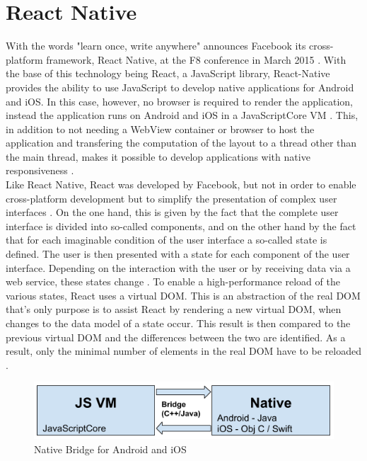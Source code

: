 \documentclass[Bachelor,BIF,english]{twbook}
\begin{document}
\section{React Native}
With the words "learn once, write anywhere" announces Facebook its cross-platform framework, React Native, at the F8 conference in March 2015 \cite[p.~10]{Danielsson_2016} \cite[p.~21]{ZubaBernhard2017EdPb}. With the base of this technology being React, a JavaScript library, React-Native provides the ability to use JavaScript to develop native applications for Android and iOS. In this case, however, no browser is required to render the application, instead the application runs on Android and iOS in a JavaScriptCore VM \cite[p.~10]{Danielsson_2016} \cite[p.~28]{ZubaBernhard2017EdPb}. This, in addition to not needing a WebView container or browser to host the application and transfering the computation of the layout to a thread other than the main thread, makes it possible to develop applications with native responsiveness \cite[p.~10-11]{Danielsson_2016}.
\\[\baselineskip]
Like React Native, React was developed by Facebook, but not in order to enable cross-platform development but to simplify the presentation of complex user interfaces \cite[p.~8]{Danielsson_2016}. On the one hand, this is given by the fact that the complete user interface is divided into so-called components, and on the other hand by the fact that for each imaginable condition of the user interface a so-called state is defined. The user is then presented with a state for each component of the user interface. Depending on the interaction with the user or by receiving data via a web service, these states change \cite[p.~8-9]{Danielsson_2016} \cite[p.~21-27]{ZubaBernhard2017EdPb}. To enable a high-performance reload of the various states, React uses a virtual DOM. This is an abstraction of the real DOM that's only purpose is to assist React by rendering a new virtual DOM, when changes to the data model of a state occur. This result is then compared to the previous virtual DOM and the differences between the two are identified. As a result, only the minimal number of elements in the real DOM have to be reloaded \cite[p.~8-9]{Danielsson_2016}.
\begin{figure}[!htbp]
\centering
\includegraphics[width=0.75\linewidth]{PICs/Bachelor1_NativeBridge.png}
\caption{Native Bridge for Android and iOS \cite{PicReactNativeBridge} \cite[p.~28]{ZubaBernhard2017EdPb}}\label{Fig4}
\end{figure}
\end{document}
